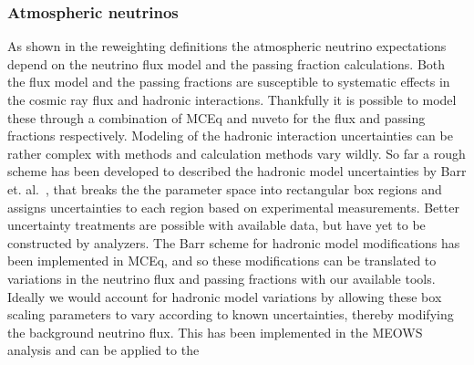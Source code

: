 \subsubsection{Atmospheric neutrinos}
As shown in the reweighting definitions the atmospheric neutrino expectations depend on the neutrino flux model and the passing fraction calculations.
Both the flux model and the passing fractions are susceptible to systematic effects in the cosmic ray flux and hadronic interactions.
Thankfully it is possible to model these through a combination of MCEq and nuveto for the flux and passing fractions respectively.
Modeling of the hadronic interaction uncertainties can be rather complex with methods and calculation methods vary wildly.
So far a rough scheme has been developed to described the hadronic model uncertainties by Barr et. al.~\cite{Barr:2004br}, that breaks the the parameter space into rectangular box regions and assigns uncertainties to each region based on experimental measurements.
Better uncertainty treatments are possible with available data, but have yet to be constructed by analyzers.
The Barr scheme for hadronic model modifications has been implemented in MCEq, and so these modifications can be translated to variations in the neutrino flux and passing fractions with our available tools.
Ideally we would account for hadronic model variations by allowing these box scaling parameters to vary according to known uncertainties, thereby modifying the background neutrino flux.
This has been implemented in the MEOWS analysis and can be applied to the 


